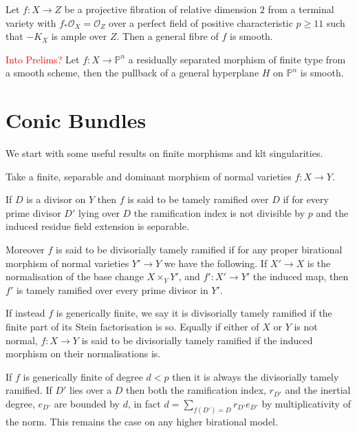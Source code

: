 \documentclass[a4paper,12pt]{book}
\newcommand{\ox}{\mathcal{O}_{X}}
\newcommand\myworries[1]{\textcolor{red}{#1}}
\begin{document}
\begin{theorem}\cite[Corollary 1.6]{patakfalvi2017singularities}\label{smoothness}
	Let $f\colon X \to Z$ be a projective fibration of relative dimension $2$ from a terminal variety with $f_{*}\ox=\mathcal{O}_{Z}$ over a perfect field of positive characteristic $p \geq 11$ such that $-K_{X}$ is ample over $Z$. Then a general fibre of $f$ is smooth.
\end{theorem}

\begin{theorem}\cite[Theorem 1]{cumino1986axiomatic}\label{Bertini}\myworries{Into Prelims?}
	Let $f\colon X \to \mathbb{P}^{n}$ a residually separated morphism of finite type from a smooth scheme, then the pullback of a general hyperplane $H$ on $\mathbb{P}^{n}$ is smooth.
\end{theorem}



\section{Conic Bundles}
	We start with some useful results on finite morphisms and klt singularities.
	
	\begin{definition}
		Take a finite, separable and dominant morphism of normal varieties $f\colon X \to Y$.
		
		If $D$ is a divisor on $Y$ then $f$ is said to be tamely ramified over $D$ if for every prime divisor $D'$ lying over $D$ the ramification index is not divisible by $p$ and the induced residue field extension is separable.
		
		Moreover $f$ is said to be divisorially tamely ramified if for any proper birational morphism of normal varieties $Y' \to Y$ we have the following. If $X' \to X$ is the normalisation of the base change $X\times_{Y}Y'$, and $f'\colon X'\to Y'$  the induced map, then $f'$ is tamely ramified over every prime divisor in $Y'$.
		
		If instead $f$ is generically finite, we say it is divisorially tamely ramified if the finite part of its Stein factorisation is so. Equally if either of $X$ or $Y$ is not normal, $f\colon X \to Y$ is said to be divisorially tamely ramified if the induced morphism on their normalisations is.
	\end{definition}
	
	If $f$ is generically finite of degree $d <p$ then it is always the divisorially tamely ramified. If $D'$ lies over a $D$ then both the ramification index, $r_{D'}$ and the inertial degree, $e_{D'}$ are bounded by $d$, in fact $d= \sum_{f(D')=D} r_{D'}e_{D'}$ by multiplicativity of the norm. This remains the case on any higher birational model.
	
\end{document}
